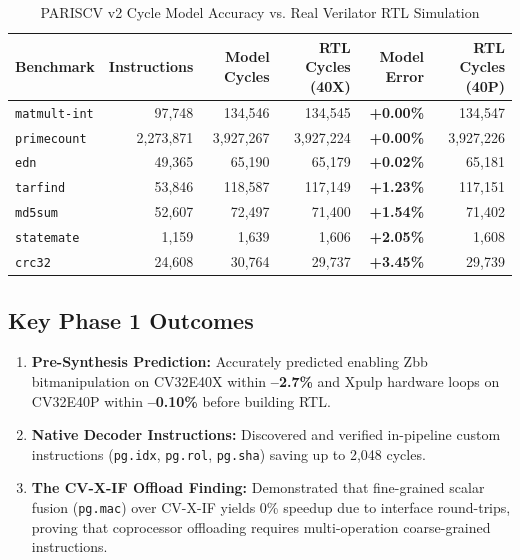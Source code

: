 \documentclass[11pt,a4paper]{article}
\begin{document}
\begin{table}[h]
\centering
\small
\caption{PARISCV v2 Cycle Model Accuracy vs. Real Verilator RTL Simulation}
\label{tab:validation}
\begin{tabular}{lrrrrr}
\toprule
\textbf{Benchmark} & \textbf{Instructions} & \textbf{Model Cycles} & \textbf{RTL Cycles (40X)} & \textbf{Model Error} & \textbf{RTL Cycles (40P)} \\
\midrule
\texttt{matmult-int} & 97,748    & 134,546   & 134,545   & \textbf{+0.00\%} & 134,547 \\
\texttt{primecount}  & 2,273,871 & 3,927,267 & 3,927,224 & \textbf{+0.00\%} & 3,927,226 \\
\texttt{edn}         & 49,365    & 65,190    & 65,179    & \textbf{+0.02\%} & 65,181 \\
\texttt{tarfind}     & 53,846    & 118,587   & 117,149   & \textbf{+1.23\%} & 117,151 \\
\texttt{md5sum}      & 52,607    & 72,497    & 71,400    & \textbf{+1.54\%} & 71,402 \\
\texttt{statemate}   & 1,159     & 1,639     & 1,606     & \textbf{+2.05\%} & 1,608 \\
\texttt{crc32}       & 24,608    & 30,764    & 29,737    & \textbf{+3.45\%} & 29,739 \\
\bottomrule
\end{tabular}
\end{table}

\subsection{Key Phase 1 Outcomes}
\begin{enumerate}[leftmargin=*]
    \item \textbf{Pre-Synthesis Prediction:} Accurately predicted enabling Zbb bitmanipulation on CV32E40X within \textbf{--2.7\%} and Xpulp hardware loops on CV32E40P within \textbf{--0.10\%} before building RTL.
    \item \textbf{Native Decoder Instructions:} Discovered and verified in-pipeline custom instructions (\texttt{pg.idx}, \texttt{pg.rol}, \texttt{pg.sha}) saving up to 2,048 cycles.
    \item \textbf{The CV-X-IF Offload Finding:} Demonstrated that fine-grained scalar fusion (\texttt{pg.mac}) over CV-X-IF yields 0\% speedup due to interface round-trips, proving that coprocessor offloading requires multi-operation coarse-grained instructions.
\end{enumerate}
\end{document}

